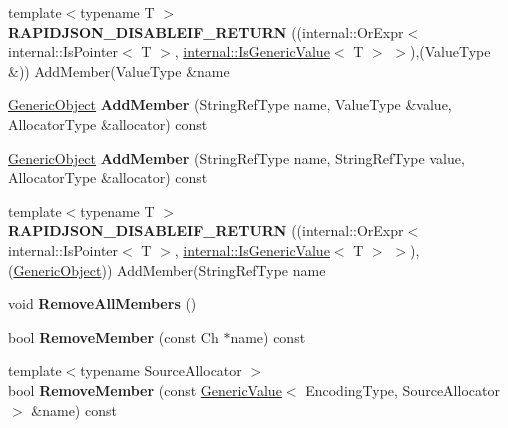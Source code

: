 \begin{DoxyCompactItemize}
\item 
{\footnotesize template$<$typename T $>$ }\\{\bfseries R\+A\+P\+I\+D\+J\+S\+O\+N\+\_\+\+D\+I\+S\+A\+B\+L\+E\+I\+F\+\_\+\+R\+E\+T\+U\+RN} ((internal\+::\+Or\+Expr$<$ internal\+::\+Is\+Pointer$<$ T $>$, \hyperlink{structinternal_1_1_is_generic_value}{internal\+::\+Is\+Generic\+Value}$<$ T $>$ $>$),(Value\+Type \&)) Add\+Member(Value\+Type \&name\hypertarget{class_generic_object_a98ebcec632c41442d89cd8634b7ecc47}{}\label{class_generic_object_a98ebcec632c41442d89cd8634b7ecc47}

\item 
\hyperlink{class_generic_object}{Generic\+Object} {\bfseries Add\+Member} (String\+Ref\+Type name, Value\+Type \&value, Allocator\+Type \&allocator) const \hypertarget{class_generic_object_a245647b72d87ffe6142d1c656f0e92d8}{}\label{class_generic_object_a245647b72d87ffe6142d1c656f0e92d8}

\item 
\hyperlink{class_generic_object}{Generic\+Object} {\bfseries Add\+Member} (String\+Ref\+Type name, String\+Ref\+Type value, Allocator\+Type \&allocator) const \hypertarget{class_generic_object_a5cb6c166992abe5674a287bbc02d8f2f}{}\label{class_generic_object_a5cb6c166992abe5674a287bbc02d8f2f}

\item 
{\footnotesize template$<$typename T $>$ }\\{\bfseries R\+A\+P\+I\+D\+J\+S\+O\+N\+\_\+\+D\+I\+S\+A\+B\+L\+E\+I\+F\+\_\+\+R\+E\+T\+U\+RN} ((internal\+::\+Or\+Expr$<$ internal\+::\+Is\+Pointer$<$ T $>$, \hyperlink{structinternal_1_1_is_generic_value}{internal\+::\+Is\+Generic\+Value}$<$ T $>$ $>$),(\hyperlink{class_generic_object}{Generic\+Object})) Add\+Member(String\+Ref\+Type name\hypertarget{class_generic_object_af361a4b677882964789201fc605541d0}{}\label{class_generic_object_af361a4b677882964789201fc605541d0}

\item 
void {\bfseries Remove\+All\+Members} ()\hypertarget{class_generic_object_a129ce3843a6658e620a7f740d9f44ee1}{}\label{class_generic_object_a129ce3843a6658e620a7f740d9f44ee1}

\item 
bool {\bfseries Remove\+Member} (const Ch $\ast$name) const \hypertarget{class_generic_object_a64bfcf1671efa5de04cc7659a014a29d}{}\label{class_generic_object_a64bfcf1671efa5de04cc7659a014a29d}

\item 
{\footnotesize template$<$typename Source\+Allocator $>$ }\\bool {\bfseries Remove\+Member} (const \hyperlink{class_generic_value}{Generic\+Value}$<$ Encoding\+Type, Source\+Allocator $>$ \&name) const \hypertarget{class_generic_object_acca9953e3c2e6df16d7685572ac3fe9d}{}\label{class_generic_object_acca9953e3c2e6df16d7685572ac3fe9d}


\end{DoxyCompactItemize}
